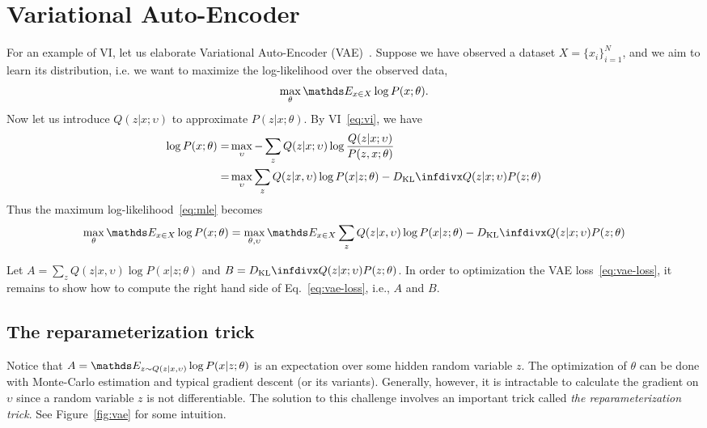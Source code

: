 \documentclass{article}
\begin{document}
\section{Variational Auto-Encoder}
For an example of VI, let us elaborate Variational Auto-Encoder (VAE)~\cite{kingma2013autoencoding}.
Suppose we have observed a dataset $X = \{x_i\}_{i=1}^N$, and we aim to learn its distribution, i.e. we want to maximize the log-likelihood over the observed data,
\begin{equation}\label{eq:mle}
    \max_{\theta}\Ebb_{x\in X}\log P(x;\theta).
\end{equation}
Now let us introduce $Q(z|x;\upsilon)$ to approximate $P(z|x;\theta)$.
By VI~\eqref{eq:vi}, we have
\begin{equation}
\begin{aligned}
    \log P(x;\theta) 
    =& \max_{\upsilon} - \sum_{z} Q(z|x;\upsilon) \log \frac{Q(z|x;\upsilon)}{P(z,x;\theta)} \\
    =& \max_{\upsilon} \sum_{z}Q(z|x,\upsilon)\log P(x|z;\theta) - \kld{Q(z|x;\upsilon)}{P(z; \theta)}
\end{aligned}
\end{equation}
Thus the maximum log-likelihood~\eqref{eq:mle} becomes
\begin{equation}\label{eq:vae-loss}
    \max_{\theta}\Ebb_{x\in X}\log P(x;\theta) = \max_{\theta, \upsilon} \Ebb_{x\in X}\sum_{z}Q(z|x,\upsilon)\log P(x|z;\theta) - \kld{Q(z|x;\upsilon)}{P(z; \theta)}
\end{equation}

Let $A = \sum_{z}Q(z|x,\upsilon)\log P(x|z;\theta)$ and $B = \kld{Q(z|x;\upsilon)}{P(z; \theta)}$.
In order to optimization the VAE loss~\eqref{eq:vae-loss}, it remains to show how to compute the right hand side of Eq.~\eqref{eq:vae-loss}, i.e., $A$ and $B$.

\subsection{The reparameterization trick}
Notice that $A = \Ebb_{z\sim Q(z|x,\upsilon)}\log P(x|z;\theta)$ is an expectation over some hidden random variable $z$.
The optimization of $\theta$ can be done with Monte-Carlo estimation and typical gradient descent (or its variants).
Generally, however, it is intractable to calculate the gradient on $\upsilon$ since a random variable $z$ is not differentiable.
The solution to this challenge involves an important trick called \emph{the reparameterization trick}.
See Figure~\ref{fig:vae} for some intuition.
\end{document}
